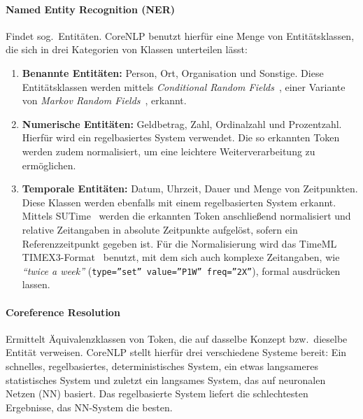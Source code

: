 \paragraph{Named Entity Recognition (NER)}
Findet sog.\ Entitäten.
CoreNLP benutzt hierfür eine Menge von Entitätsklassen, die sich in drei Kategorien von Klassen unterteilen lässt:
\begin{enumerate}
	\item \textbf{Benannte Entitäten:}
		Person, Ort, Organisation und Sonstige.
		Diese Entitätsklassen werden mittels \textit{Conditional Random Fields}~\cite{Finkel2005}, einer Variante von \textit{Markov Random Fields}~, erkannt.
	\item \textbf{Numerische Entitäten:}
		Geldbetrag, Zahl, Ordinalzahl und Prozentzahl.
		Hierfür wird ein regelbasiertes System verwendet.
		Die so erkannten Token werden zudem normalisiert, um eine leichtere Weiterverarbeitung zu ermöglichen.
	\item \textbf{Temporale Entitäten:}
		Datum, Uhrzeit, Dauer und Menge von Zeitpunkten.
		Diese Klassen werden ebenfalls mit einem regelbasierten System erkannt.
		Mittels SUTime~\cite{Chang2012} werden die erkannten Token anschließend normalisiert und relative Zeitangaben in absolute Zeitpunkte aufgelöst, sofern ein Referenzzeitpunkt gegeben ist.
		Für die Normalisierung wird das TimeML TIMEX3-Format~\cite{TIMEX3} benutzt, mit dem sich auch komplexe Zeitangaben, wie \textit{``twice a week''} (\texttt{type=''set'' value=''P1W'' freq=''2X''}), formal ausdrücken lassen.
\end{enumerate}

\paragraph{Coreference Resolution}
Ermittelt Äquivalenzklassen von Token, die auf dasselbe Konzept bzw.\ dieselbe Entität verweisen.
CoreNLP stellt hierfür drei verschiedene Systeme bereit:
Ein schnelles, regelbasiertes, deterministisches System, ein etwas langsameres statistisches System und zuletzt ein langsames System, das auf neuronalen Netzen (NN) basiert.
Das regelbasierte System liefert die schlechtesten Ergebnisse, das NN-System die besten.

